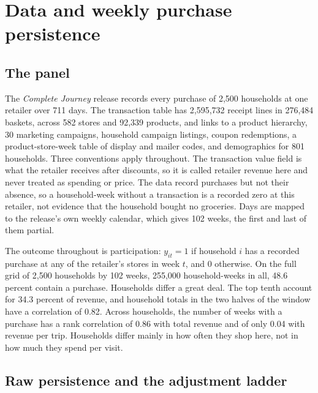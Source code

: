 \documentclass[11pt]{article}
\begin{document}
\section{Data and weekly purchase persistence}
\label{sec:data}

\subsection{The panel}

The \emph{Complete Journey} release \citep{dunnhumby} records every purchase of 2,500
households at one retailer over 711 days. The transaction table has 2,595,732 receipt lines
in 276,484 baskets, across 582 stores and 92,339 products, and links to a product hierarchy,
30 marketing campaigns, household campaign listings, coupon redemptions, a
product-store-week table of display and mailer codes, and demographics for 801 households.
Three conventions apply throughout. The transaction value field is what the retailer receives
after discounts, so it is called retailer revenue here and never treated as spending or
price. The data record purchases but not their absence, so a household-week without a
transaction is a recorded zero at this retailer, not evidence that the household bought no
groceries. Days are mapped to the release's own weekly calendar, which gives 102 weeks, the
first and last of them partial.

The outcome throughout is participation: $y_{it}=1$ if household $i$ has a recorded purchase
at any of the retailer's stores in week $t$, and $0$ otherwise. On the full grid of 2,500 households by 102 weeks, 255,000
household-weeks in all, 48.6 percent contain a purchase. Households differ a great deal. The
top tenth account for 34.3 percent of revenue, and household totals in the two halves of the
window have a correlation of 0.82. Across households, the number of weeks with a purchase
has a rank correlation of 0.86 with total revenue and of only 0.04 with revenue per trip.
Households differ mainly in how often they shop here, not in how much they spend per visit.

\subsection{Raw persistence and the adjustment ladder}
\end{document}
